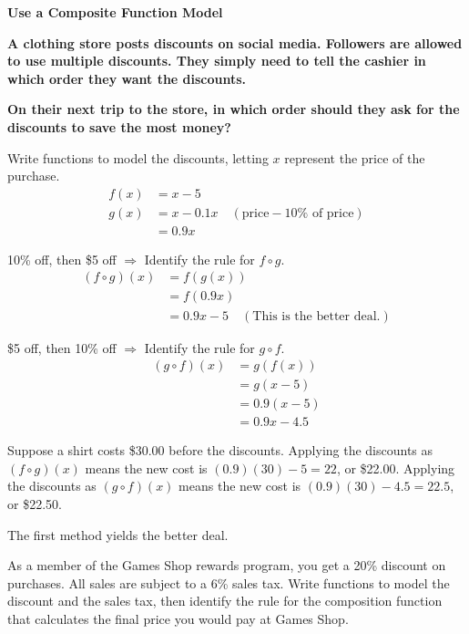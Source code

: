 \documentclass{article}
\newenvironment{example}[1]{}{}
\newenvironment{tryit}[1]{}{}
\newcommand{\placeholder}[2]{}
\begin{document}
\begin{example}{6}
\textbf{Use a Composite Function Model}

\textbf{A clothing store posts discounts on social media. Followers are allowed to use multiple discounts. They simply need to tell the cashier in which order they want the discounts.}

\textbf{On their next trip to the store, in which order should they ask for the discounts to save the most money?}

\placeholder{photo}{Smartphone screen showing two coupons: "\$5 OFF NEXT PURCHASE" and "10\% OFF NEXT PURCHASE"}

Write functions to model the discounts, letting $x$ represent the price of the purchase.
\begin{align*}
f(x) &= x - 5 \\
g(x) &= x - 0.1x \quad (\text{price} - 10\% \text{ of price}) \\
&= 0.9x
\end{align*}

10\% off, then \$5 off $\Rightarrow$ Identify the rule for $f \circ g$.
\begin{align*}
(f \circ g)(x) &= f(g(x)) \\
&= f(0.9x) \\
&= 0.9x - 5 \quad (\text{This is the better deal.})
\end{align*}

\$5 off, then 10\% off $\Rightarrow$ Identify the rule for $g \circ f$.
\begin{align*}
(g \circ f)(x) &= g(f(x)) \\
&= g(x - 5) \\
&= 0.9(x - 5) \\
&= 0.9x - 4.5
\end{align*}

Suppose a shirt costs \$30.00 before the discounts. Applying the discounts as $(f \circ g)(x)$ means the new cost is $(0.9)(30) - 5 = 22$, or \$22.00. Applying the discounts as $(g \circ f)(x)$ means the new cost is $(0.9)(30) - 4.5 = 22.5$, or \$22.50.

The first method yields the better deal.
\end{example}

\begin{tryit}{6}
As a member of the Games Shop rewards program, you get a 20\% discount on purchases. All sales are subject to a 6\% sales tax. Write functions to model the discount and the sales tax, then identify the rule for the composition function that calculates the final price you would pay at Games Shop.
\end{tryit}
\end{document}
